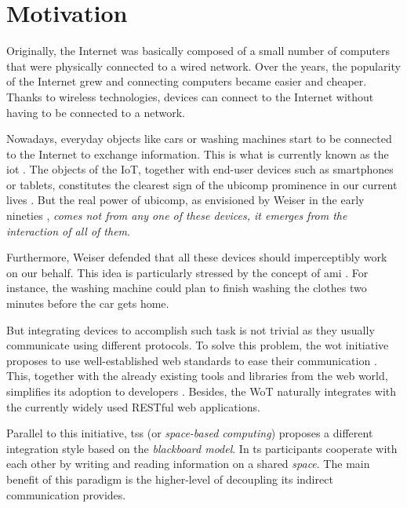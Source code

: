 \section{Motivation}
\label{sec:Motivation}

Originally, the Internet was basically composed of a small number of computers that were physically connected to a wired network.
Over the years, the popularity of the Internet grew and connecting computers became easier and cheaper.
Thanks to wireless technologies, devices can connect to the Internet without having to be connected to a network.

Nowadays, everyday objects like cars or washing machines start to be connected to the Internet to exchange information.
This is what is currently known as the \ac{iot} \citep{atzori_internet_2010}.
The objects of the IoT, together with end-user devices such as smartphones or tablets, constitutes the clearest sign of the \ac{ubicomp} prominence in our current lives \citep{caceres_ubicomp_2012}.
But the real power of \ac{ubicomp}, as envisioned by Weiser in the early nineties \citep{weiser1991computer}, \emph{comes not from any one of these devices, it emerges from the interaction of all of them}.

Furthermore, Weiser defended that all these devices should imperceptibly work on our behalf.
This idea is particularly stressed by the concept of \ac{ami} \citep{ramos_ambient_2008}.
For instance, the washing machine could plan to finish washing the clothes two minutes before the car gets home.

\medskip

But integrating devices to accomplish such task is not trivial as they usually communicate using different protocols.
To solve this problem, the \ac{wot} initiative proposes to use well-established web standards to ease their communication \citep{guinard_thesis_2011}.
This, together with the already existing tools and libraries from the web world, simplifies its adoption to developers \citep{guinard_search_2011}.
Besides, the WoT naturally integrates with the currently widely used RESTful web applications.

Parallel to this initiative, \aclp{ts} (or \emph{space-based computing}) \citep{gelernter_generative_1985} proposes a different integration style based on the \emph{blackboard model}.
In \ac{ts} participants cooperate with each other by writing and reading information on a shared \emph{space}.
The main benefit of this paradigm is the higher-level of decoupling its indirect communication provides. %

